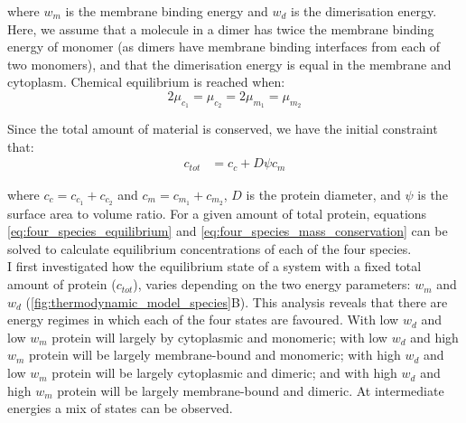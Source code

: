 \documentclass[12pt]{"report"}
\begin{document}
where $w_m$ is the membrane binding energy and $w_d$ is the dimerisation energy. Here, we assume that a molecule in a dimer has twice the membrane binding energy of monomer (as dimers have membrane binding interfaces from each of two monomers), and that the dimerisation energy is equal in the membrane and cytoplasm. Chemical equilibrium is reached when:
\begin{equation}
2\mu_{c_1} = \mu_{c_2} = 2\mu_{m_1} = \mu_{m_2}
\label{eq:four_species_equilibrium}
\end{equation}

Since the total amount of material is conserved, we have the initial constraint that:
\begin{align}
c_{tot} &= c_c + D \psi c_m
\label{eq:four_species_mass_conservation}
\end{align}

where $c_c = c_{c_1} + c_{c_2}$ and $c_m = c_{m_1} + c_{m_2}$, $D$ is the protein diameter, and $\psi$ is the surface area to volume ratio. For a given amount of total protein, equations \ref{eq:four_species_equilibrium} and \ref{eq:four_species_mass_conservation} can be solved to calculate equilibrium concentrations of each of the four species.\\

I first investigated how the equilibrium state of a system with a fixed total amount of protein ($c_{tot}$), varies depending on the two energy parameters: $w_m$ and $w_d$ (\cref{fig:thermodynamic_model_species}B). This analysis reveals that there are energy regimes in which each of the four states are favoured. With low $w_d$ and low $w_m$ protein will largely by cytoplasmic and monomeric; with low $w_d$ and high $w_m$ protein will be largely membrane-bound and monomeric; with high $w_d$ and low $w_m$ protein will be largely cytoplasmic and dimeric; and with high $w_d$ and high $w_m$ protein will be largely membrane-bound and dimeric. At intermediate energies a mix of states can be observed.\\
\end{document}
